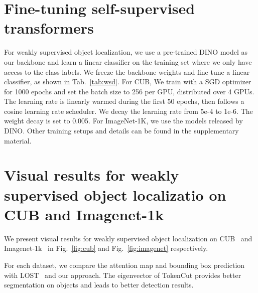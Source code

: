 \documentclass[twocolumn]{article}
\begin{document}
\section{Fine-tuning self-supervised transformers}  
For weakly supervised object localization, we use a pre-trained DINO  model as our backbone and learn a linear classifier on the training set where we only have access to the class labels. We freeze the backbone weights and fine-tune a linear classifier, as shown in Tab.~\ref{tab:wsd}. For CUB, We train with a SGD optimizer for 1000 epochs and set the batch size to 256 per GPU, distributed over 4 GPUs. The learning rate is linearly warmed during the first 50 epochs, then follows a cosine learning rate scheduler. We decay the learning rate from 5e-4 to 1e-6. The weight decay is set to 0.005. For ImageNet-1K, we use the models released by DINO. Other training setups and details can be found in the supplementary material. 


\section{Visual results for weakly supervised object localizatio on CUB and Imagenet-1k}
\label{sec:wsod}

We present visual results for weakly supervised object localization on CUB~\cite{WahCUB_200_2011} and Imagenet-1k~\cite{deng2009imagenet} in Fig.~\ref{fig:cub} and Fig.~\ref{fig:imagenet} respectively.

For each dataset, we compare the attention map and bounding box prediction with LOST~\cite{simeoni2021localizing} and our approach. The eigenvector of  TokenCut provides better segmentation on objects and leads to better detection results.
\end{document}
